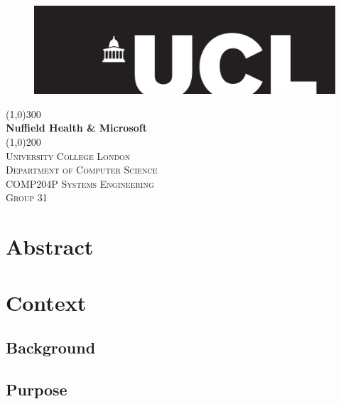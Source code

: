 \documentclass[12pt]{article}
\begin{document}
\begin{titlepage}
\begin{center}
\begin{figure}[t]
\hspace*{0.35cm}\includegraphics[width=1.0\textwidth]{uclLogo}\\
\end{figure}
\line(1,0){300}\\
[0.25in]
\huge{\bfseries Nuffield Health \& Microsoft}\\
[2mm]
\line(1,0){200}\\
[1.5cm]
\textsc{\LARGE University College London}\\
\textsc{\normalsize Department of Computer Science}\\
\textsc{\normalsize COMP204P Systems Engineering}\\
\textsc{\normalsize Group 31}\\
[5cm]
\end{center}

\end{titlepage}
\tableofcontents

\newpage
\section{Abstract}\label{sec:abstract}





\newpage
\section{Context}\label{sec:context}

\subsection{Background}

\subsection{Purpose}\label{sec:purpose}
\end{document}
